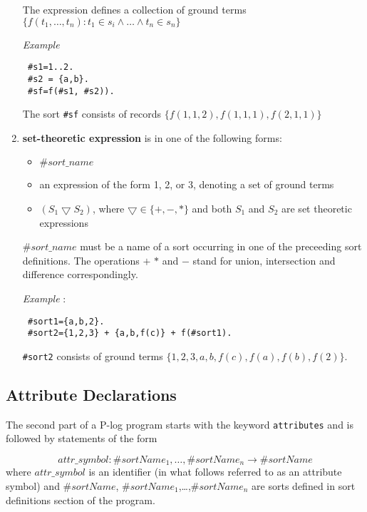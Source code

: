\documentclass[12pt, letterpaper]{article}
\begin{document}
\begin{enumerate}
The expression defines a collection of ground terms 
\\ $\{f(t_1,\dots,t_n):  t_1 \in s_i \land \dots \land t_n \in s_n\}$

\textit{Example}
\begin{verbatim}
 #s1=1..2.
 #s2 = {a,b}.
 #sf=f(#s1, #s2)). 
\end{verbatim}

The sort \texttt{\#sf} consists of records $\{f(1,1,2),f(1,1,1),f(2,1,1)\}$



 \item\label{setexpr} \textbf{set-theoretic expression} is in one of the following forms:
\begin{itemize}
\item $\#sort\_name$  
\item an expression of the form 1, 2, or 3, denoting a set of ground terms
\item $(S_1 \bigtriangledown S_2)$, where $\bigtriangledown \in \{+,-,*\}$ and both $S_1$ and $S_2$ are set theoretic expressions
\end{itemize}

$\#sort\_name$ must be a name of a sort occurring in one of the preceeding sort definitions. 
The operations $+$ $*$ and $-$ stand for union, intersection and difference correspondingly.


\textit{Example} : 
\begin{verbatim}
 #sort1={a,b,2}.
 #sort2={1,2,3} + {a,b,f(c)} + f(#sort1).
\end{verbatim}
 \texttt{\#sort2} consists of ground terms $\{1,2,3,a,b,f(c),f(a),f(b),f(2)\}$.

\end{enumerate}

\subsection{Attribute Declarations}

\noindent  The second part of a  P-log program starts with the keyword \texttt{attributes}
and is followed by statements of the form

\begin{equation*}
attr\_symbol : \#sortName_1,\dots,\#sortName_n \rightarrow \#sortName  
\end{equation*}
where $attr\_symbol$ is an identifier (in what follows referred to as an attribute symbol) and
$\#sortName$, $\#sortName_1$,\dots,$\#sortName_n$ are sorts defined in sort definitions section of the program.
\end{document}
